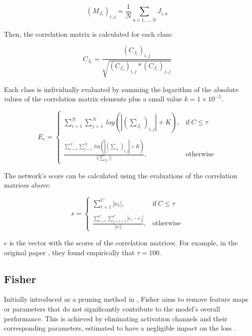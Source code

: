 \begin{equation}
    (M_{J_c})_{i,j} = \frac{1}{N} \sum_{n \in {1,...,N}} J_{i,n}
\end{equation}

Then, the correlation matrix is calculated for each class:

\begin{equation}
    C_{J_c} = \frac{(C_{J_c})_{i,j}}{\sqrt{(C_{J_c})_{i,j} * (C_{J_c})_{j,j}}}
\end{equation}


Each class is individually evaluated by summing the logarithm of the absolute values of the correlation matrix elements plus a small value $k = 1 \times 10^{-5}$.

\begin{equation}
    E_c = 
    \begin{cases}
        \sum^N_{i=1} \sum^N_{j=1}\ log(|(\sum_{J_c})_{i,j}| + K), & \text{if}\ C \leq \tau \\ \\ 
        \frac{\sum^N_{i=1} \sum^N_{j=1}\ log(|(\sum_{J_c})_{i,j}| + K)}{||\sum_{J_c}||}, & \text{otherwise}
    \end{cases}
\end{equation}

The network's score can be calculated using the evaluations of the correlation matrices above: 

\begin{equation}
    s = 
    \begin{cases}
        \sum_{t=1}^C |e_t|, & \text{if}\ C \leq \tau \\ \\ 
        \frac{\sum_{t=e}^C \sum_{j=i+1}^C |e_i - e_j|}{||e||}, & \text{otherwise}
    \end{cases}
\end{equation}

$e$ is the vector with the scores of the correlation matrices. For example, in the original paper \autocite{lopes2021epe}, they found empirically that $\tau = 100$. 


\subsection{Fisher}
Initially introduced as a pruning method in \autocite{DBLP:journals/corr/abs-1801-05787}, Fisher aims to remove feature maps or parameters that do not significantly contribute to the model's overall performance. This is achieved by eliminating activation channels and their corresponding parameters, estimated to have a negligible impact on the loss \autocite{abdelfattah2021zero}.

